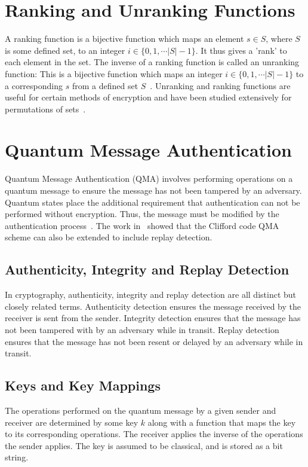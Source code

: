 \section{Ranking and Unranking Functions}
\label{subsec:unrankingFunction}
A ranking function is a bijective function which maps an element $s \in S$, where $S$ is some defined set, to an integer $i \in \{0, 1, \cdots \lvert S \rvert - 1\}$. It thus gives a 'rank' to each element in the set. The inverse of a ranking function is called an unranking function: This is a bijective function which maps an integer $i \in \{0, 1, \cdots \lvert S \rvert - 1\}$ to a corresponding $s$ from a defined set $S$~\cite{shimizu2014unranking}. Unranking and ranking functions are useful for certain methods of encryption and have been studied extensively for permutations of sets~\cite{arndt2010matters}.

\section{Quantum Message Authentication}
Quantum Message Authentication (QMA) involves performing operations on a quantum message to ensure the message has not been tampered by an adversary. Quantum states place the additional requirement that authentication can not be performed without encryption. Thus, the message must be modified by the authentication process~\cite{barnum2002authentication}. The work in~\cite{barbeau2022authenticity} showed that the Clifford code QMA scheme can also be extended to include replay detection.
\subsection{Authenticity, Integrity and Replay Detection}
In cryptography, authenticity, integrity and replay detection are all distinct but closely related terms. Authenticity detection ensures the message received by the receiver is sent from the sender. Integrity detection ensures that the message has not been tampered with by an adversary while in transit. Replay detection ensures that the message has not been resent or delayed by an adversary while in transit.
\subsection{Keys and Key Mappings}
The operations performed on the quantum message by a given sender and receiver are determined by some key $k$ along with a function that maps the key to its corresponding operations. The receiver applies the inverse of the operations the sender applies. The key is assumed to be classical, and is stored as a bit string.
